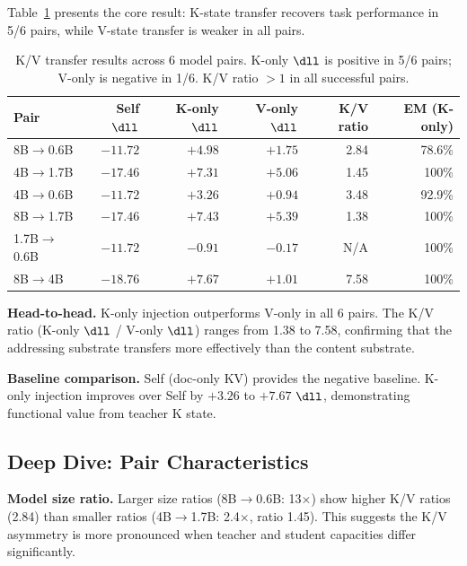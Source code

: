 Table~\ref{tab:main} presents the core result:
K-state transfer recovers task performance in 5/6 pairs,
while V-state transfer is weaker in all pairs.

\begin{table}[t]
\centering
\caption{K/V transfer results across 6 model pairs.
K-only $\dll$ is positive in 5/6 pairs; V-only is negative in 1/6.
K/V ratio $> 1$ in all successful pairs.}
\label{tab:main}
\begin{tabular}{lrrrrr}
\toprule
Pair & Self $\dll$ & K-only $\dll$ & V-only $\dll$ & K/V ratio & EM (K-only) \\
\midrule
8B$\to$0.6B & $-11.72$ & $+4.98$ & $+1.75$ & 2.84 & 78.6\% \\
4B$\to$1.7B & $-17.46$ & $+7.31$ & $+5.06$ & 1.45 & 100\% \\
4B$\to$0.6B & $-11.72$ & $+3.26$ & $+0.94$ & 3.48 & 92.9\% \\
8B$\to$1.7B & $-17.46$ & $+7.43$ & $+5.39$ & 1.38 & 100\% \\
1.7B$\to$0.6B & $-11.72$ & $-0.91$ & $-0.17$ & N/A & 100\% \\
8B$\to$4B & $-18.76$ & $+7.67$ & $+1.01$ & 7.58 & 100\% \\
\bottomrule
\end{tabular}
\end{table}

\textbf{Head-to-head.}
K-only injection outperforms V-only in all 6 pairs.
The K/V ratio (K-only $\dll$ / V-only $\dll$) ranges from 1.38 to 7.58,
confirming that the addressing substrate transfers more effectively
than the content substrate.

\textbf{Baseline comparison.}
Self (doc-only KV) provides the negative baseline.
K-only injection improves over Self by $+3.26$ to $+7.67$ $\dll$,
demonstrating functional value from teacher K state.

\subsection{Deep Dive: Pair Characteristics}

\textbf{Model size ratio.}
Larger size ratios (8B$\to$0.6B: 13$\times$) show higher K/V ratios (2.84)
than smaller ratios (4B$\to$1.7B: 2.4$\times$, ratio 1.45).
This suggests the K/V asymmetry is more pronounced
when teacher and student capacities differ significantly.

